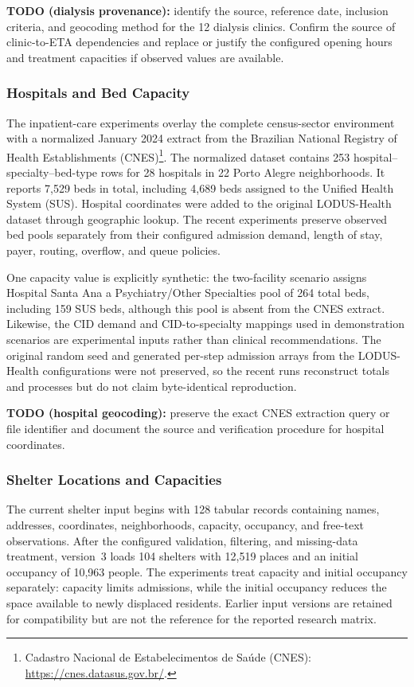 {\color{red}\textbf{TODO (dialysis provenance):} identify the source, reference date, inclusion criteria, and geocoding method for the 12 dialysis clinics. Confirm the source of clinic-to-ETA dependencies and replace or justify the configured opening hours and treatment capacities if observed values are available.}

\subsubsection{Hospitals and Bed Capacity}

The inpatient-care experiments overlay the complete census-sector environment with a normalized January 2024 extract from the Brazilian National Registry of Health Establishments (CNES)\footnote{Cadastro Nacional de Estabelecimentos de Sa\'ude (CNES): \url{https://cnes.datasus.gov.br/}.}. The normalized dataset contains 253 hospital--specialty--bed-type rows for 28 hospitals in 22 Porto Alegre neighborhoods. It reports 7,529 beds in total, including 4,689 beds assigned to the Unified Health System (SUS). Hospital coordinates were added to the original LODUS-Health dataset through geographic lookup. The recent experiments preserve observed bed pools separately from their configured admission demand, length of stay, payer, routing, overflow, and queue policies.

One capacity value is explicitly synthetic: the two-facility scenario assigns Hospital Santa Ana a Psychiatry/Other Specialties pool of 264 total beds, including 159 SUS beds, although this pool is absent from the CNES extract. Likewise, the CID demand and CID-to-specialty mappings used in demonstration scenarios are experimental inputs rather than clinical recommendations. The original random seed and generated per-step admission arrays from the LODUS-Health configurations were not preserved, so the recent runs reconstruct totals and processes but do not claim byte-identical reproduction.

{\color{red}\textbf{TODO (hospital geocoding):} preserve the exact CNES extraction query or file identifier and document the source and verification procedure for hospital coordinates.}

\subsubsection{Shelter Locations and Capacities}

The current shelter input begins with 128 tabular records containing names, addresses, coordinates, neighborhoods, capacity, occupancy, and free-text observations. After the configured validation, filtering, and missing-data treatment, version~3 loads 104 shelters with 12,519 places and an initial occupancy of 10,963 people. The experiments treat capacity and initial occupancy separately: capacity limits admissions, while the initial occupancy reduces the space available to newly displaced residents. Earlier input versions are retained for compatibility but are not the reference for the reported research matrix.


